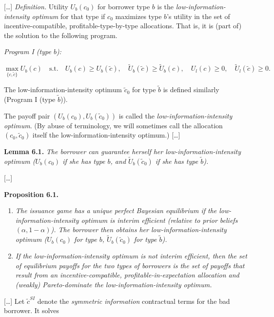 \documentclass[11pt,a4paper]{article}
\begin{document}
{[}\ldots{]} \emph{Definition.} Utility \(U_b(c_0)\) for borrower type \(b\) is the
\emph{low-information-intensity optimum} for that type if \(c_0\) maximizes type \(b\)'s utility in
the set of incentive-compatible, profitable-type-by-type allocations. That is, it is (part of) the
solution to the following program.

\emph{Program I (type \(b\)):}

\[\max_{\{c, \tilde{c}\}} U_b(c) \quad \text{s.t.} \quad U_b(c) \geqslant U_b(\tilde{c}), \quad \tilde{U}_b(\tilde{c}) \geqslant \tilde{U}_b(c), \quad U_l(c) \geqslant 0, \quad \tilde{U}_l(\tilde{c}) \geqslant 0.\]

The low-information-intensity optimum \(\tilde{c}_0\) for type \(\tilde{b}\) is defined similarly
(Program I (type \(\tilde{b}\))).

The payoff pair \((U_b(c_0), U_b(\tilde{c}_0))\) is called the \emph{low-information-intensity
optimum}. (By abuse of terminology, we will sometimes call the allocation \((c_0, \tilde{c}_0)\)
itself the low-information-intensity optimum.) {[}\ldots{]}

\textbf{Lemma 6.1.} \emph{The borrower can guarantee herself her low-information-intensity optimum
(\(U_b(c_0)\) if she has type \(b\), and \(\tilde{U}_b(\tilde{c}_0)\) if she has type
\(\tilde{b}\)).}

{[}\ldots{]}

\textbf{Proposition 6.1.}

\begin{enumerate}
\def\labelenumi{(\alph{enumi})}
\item
  \emph{The issuance game has a unique perfect Bayesian equilibrium if the low-information-intensity
  optimum is interim efficient (relative to prior beliefs \((\alpha, 1 - \alpha)\)). The borrower
  then obtains her low-information-intensity optimum (\(U_b(c_0)\) for type \(b\),
  \(\tilde{U}_b(\tilde{c}_0)\) for type \(\tilde{b}\)).}
\item
  \emph{If the low-information-intensity optimum is not interim efficient, then the set of
  equilibrium payoffs for the two types of borrowers is the set of payoffs that result from an
  incentive-compatible, profitable-in-expectation allocation and (weakly) Pareto-dominate the
  low-information-intensity optimum.}
\end{enumerate}

{[}\ldots{]} Let \(\tilde{c}^{SI}\) denote the \emph{symmetric information} contractual terms for
the bad borrower. It solves
\end{document}
